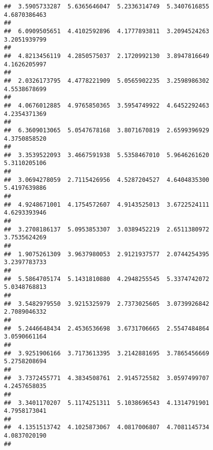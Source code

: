 \documentclass[]{article}
\begin{document}
\begin{verbatim}
##  3.5905733287  5.6365646047  5.2336314749  5.3407616855  4.6870386463 
##                                                                       
##  6.0909505651  4.4102592896  4.1777893811  3.2094524263  3.2051939799 
##                                                                       
##  4.8213456119  4.2850575037  2.1720992130  3.8947816649  4.1626205997 
##                                                                       
##  2.0326173795  4.4778221909  5.0565902235  3.2598986302  4.5538678699 
##                                                                       
##  4.0676012885  4.9765850365  3.5954749922  4.6452292463  4.2354371369 
##                                                                       
##  6.3609013065  5.0547678168  3.8071670819  2.6599396929  4.3750858520 
##                                                                       
##  3.3539522093  3.4667591938  5.5358467010  5.9646261620  5.3110205106 
##                                                                       
##  3.0694278059  2.7115426956  4.5287204527  4.6404835300  5.4197639886 
##                                                                       
##  4.9248671001  4.1754572607  4.9143525013  3.6722524111  4.6293393946 
##                                                                       
##  3.2708186137  5.0953853307  3.0389452219  2.6511380972  3.7535624269 
##                                                                       
##  1.9075261309  3.9637980053  2.9121937577  2.0744254395  3.2397783733 
##                                                                       
##  5.5864705174  5.1431810880  4.2948255545  5.3374742072  5.0348768813 
##                                                                       
##  3.5482979550  3.9215325979  2.7373025605  3.0739926842  2.7089046332 
##                                                                       
##  5.2446648434  2.4536536698  3.6731706665  2.5547484864  3.0590661164 
##                                                                       
##  3.9251906166  3.7173613395  3.2142881695  3.7865456669  5.2758208694 
##                                                                       
##  3.7372455771  4.3834508761  2.9145725582  3.0597499707  4.2457658035 
##                                                                       
##  3.3401170207  5.1174251311  5.1038696543  4.1314791901  4.7958173041 
##                                                                       
##  4.1351513742  4.1025873067  4.0817006807  4.7081145734  4.0837020190 
##                                                                       

\end{verbatim}
\end{document}
